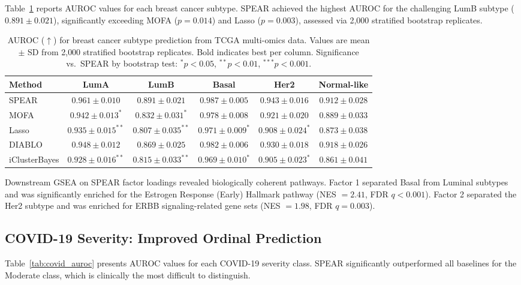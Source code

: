 \documentclass[11pt]{article}
\begin{document}
Table~\ref{tab:tcga_auroc} reports AUROC values for each breast cancer subtype. SPEAR achieved the highest AUROC for the challenging LumB subtype ($0.891 \pm 0.021$), significantly exceeding MOFA ($p = 0.014$) and Lasso ($p = 0.003$), assessed via 2{,}000 stratified bootstrap replicates.

\begin{table}[H]
\centering
\caption{AUROC ($\uparrow$) for breast cancer subtype prediction from TCGA multi-omics data. Values are mean $\pm$ SD from 2{,}000 stratified bootstrap replicates. Bold indicates best per column. Significance vs.\ SPEAR by bootstrap test: $^*p<0.05$, $^{**}p<0.01$, $^{***}p<0.001$.}
\label{tab:tcga_auroc}
\begin{tabular}{lccccc}
\toprule
Method & LumA & LumB & Basal & Her2 & Normal-like \\
\midrule
SPEAR & $\mathbf{0.961 \pm 0.010}$ & $\mathbf{0.891 \pm 0.021}$ & $\mathbf{0.987 \pm 0.005}$ & $\mathbf{0.943 \pm 0.016}$ & $0.912 \pm 0.028$ \\
MOFA & $0.942 \pm 0.013^{*}$ & $0.832 \pm 0.031^{*}$ & $0.978 \pm 0.008$ & $0.921 \pm 0.020$ & $0.889 \pm 0.033$ \\
Lasso & $0.935 \pm 0.015^{**}$ & $0.807 \pm 0.035^{**}$ & $0.971 \pm 0.009^{*}$ & $0.908 \pm 0.024^{*}$ & $0.873 \pm 0.038$ \\
DIABLO & $0.948 \pm 0.012$ & $0.869 \pm 0.025$ & $0.982 \pm 0.006$ & $0.930 \pm 0.018$ & $\mathbf{0.918 \pm 0.026}$ \\
iClusterBayes & $0.928 \pm 0.016^{**}$ & $0.815 \pm 0.033^{**}$ & $0.969 \pm 0.010^{*}$ & $0.905 \pm 0.023^{*}$ & $0.861 \pm 0.041$ \\
\bottomrule
\end{tabular}
\end{table}

Downstream GSEA on SPEAR factor loadings revealed biologically coherent pathways. Factor 1 separated Basal from Luminal subtypes and was significantly enriched for the Estrogen Response (Early) Hallmark pathway (NES $= 2.41$, FDR $q < 0.001$). Factor 2 separated the Her2 subtype and was enriched for ERBB signaling-related gene sets (NES $= 1.98$, FDR $q = 0.003$).

\subsection{COVID-19 Severity: Improved Ordinal Prediction}

Table~\ref{tab:covid_auroc} presents AUROC values for each COVID-19 severity class. SPEAR significantly outperformed all baselines for the Moderate class, which is clinically the most difficult to distinguish.
\end{document}
